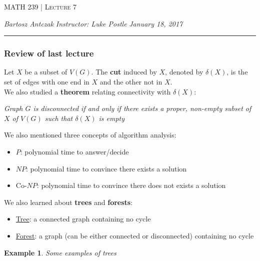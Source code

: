 \documentclass{report}
\newcommand{\lectureNum}{7}
\newcommand{\curDate}{January 18, 2017}
\newcommand{\course}{MATH 239}
\newcommand{\instructor}{Luke Postle}
\newtheorem{ex}{Example}[section]
\begin{document}
\begin{center}
\begin{Large}
\textsc{\course{} | Lecture \lectureNum{}}
\end{Large}
\end{center} 
\noindent \textit{Bartosz Antczak} \hfill
\textit{Instructor: \instructor{}} \hfill
\textit{\curDate{}}
\rule{\textwidth}{0.4pt}

\subsubsection{Review of last lecture}
Let $X$ be a subset of $V(G)$. The \textbf{cut} induced by $X$, denoted by $\delta(X)$, is the set of edges with one end in $X$ and the other not in $X$.\\We also studied a \textbf{theorem} relating connectivity with $\delta(X)$:
\begin{center}
\textit{Graph $G$ is disconnected if and only if there exists a proper, non-empty subset of $X$ of $V(G)$ such that $\delta(X)$ is empty}
\end{center}
We also mentioned three concepts of algorithm analysis:
\begin{itemize}
\item $P$: polynomial time to answer/decide
\item $NP$: polynomial time to convince there exists a solution
\item Co-$NP$: polynomial time to convince there does not exists a solution
\end{itemize}
We also learned about \textbf{trees} and \textbf{forests}:
\begin{itemize}
\item \underline{Tree}: a connected graph containing no cycle
\item \underline{Forest}: a graph (can be either connected or disconnected) containing no cycle
\end{itemize}
\begin{ex}
Some examples of trees
\end{ex}
\end{document}
